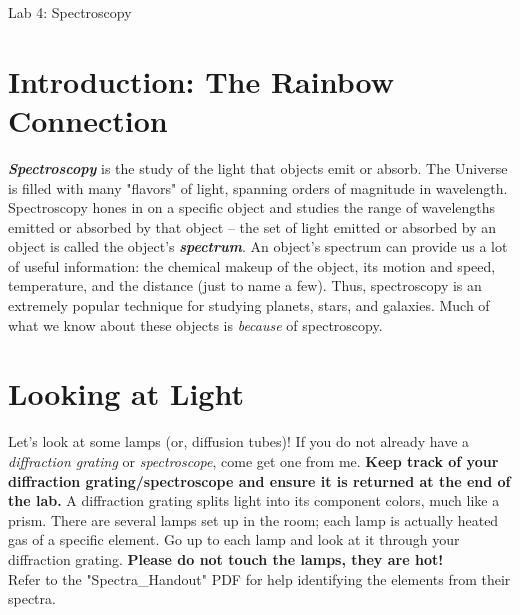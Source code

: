 \documentclass[11pt]{article}
\begin{document}
\begin{center}
\huge{Lab 4: Spectroscopy}
\end{center}

\medskip

\section{Introduction: The Rainbow Connection}

\textbf{\emph{Spectroscopy}} is the study of the light that objects emit or absorb. The Universe is filled with many "flavors" of light, spanning orders of magnitude in wavelength. Spectroscopy hones in on a specific object and studies the range of wavelengths emitted or absorbed by that object -- the set of light emitted or absorbed by an object is called the object's \textbf{\emph{spectrum}}. An object's spectrum can provide us a lot of useful information: the chemical makeup of the object, its motion and speed, temperature, and the distance (just to name a few). Thus, spectroscopy is an extremely popular technique for studying planets, stars, and galaxies. Much of what we know about these objects is \emph{because} of spectroscopy.

\section{Looking at Light}

Let's look at some lamps (or, diffusion tubes)! If you do not already have a \emph{diffraction grating} or \emph{spectroscope}, come get one from me. \textbf{Keep track of your diffraction grating/spectroscope and ensure it is returned at the end of the lab.} A diffraction grating splits light into its component colors, much like a prism. There are several lamps set up in the room; each lamp is actually heated gas of a specific element. Go up to each lamp and look at it through your diffraction grating. \textbf{Please do not touch the lamps, they are hot!} \\

Refer to the "Spectra\_Handout" PDF for help identifying the elements from their spectra.
\end{document}
